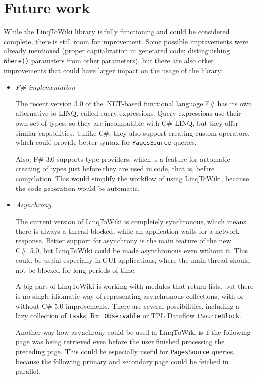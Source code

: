 \chapter{Future work}


While the LinqToWiki library is fully functioning and could be considered complete,
there is still room for improvement.
Some possible improvements were already mentioned
(proper capitalization in generated code;
distinguishing \lstinline{Where()} parameters from other parameters),
but there are also other improvements that could have larger impact on the usage of the library:

\begin{itemize}
\item \emph{F\# implementation}

The recent version 3.0 of the .NET-based functional language F\# has its own alternative to \ac{LINQ},
called query expressions.
Query expressions use their own set of types, so they are incompatible with C\# \ac{LINQ},
but they offer similar capabilities.
Unlike C\#, they also support creating custom operators,
which could provide better syntax for \lstinline{PagesSource} queries.

Also, F\# 3.0 supports type providers, which is a feature for automatic creating of types
just before they are used in code, that is, before compilation.
This would simplify the workflow of using LinqToWiki, because the code generation would be automatic.

\item \emph{Asynchrony}

The current version of LinqToWiki is completely synchronous,
which means there is always a thread blocked, while an application waits for a network response.
Better support for asynchrony is the main feature of the new C\#~5.0,
but LinqToWiki could be made asynchronous even without it.
This could be useful especially in \ac{GUI} applications, where the main thread should not be blocked for long periods of time.

A big part of LinqToWiki is working with modules that return lists,
but there is no single idiomatic way of representing asynchronous collections,
with or without C\# 5.0 improvements.
There are several possibilities, including a lazy collection of \lstinline{Task}s,
\acs{Rx} \lstinline{IObservable} or \acs{TPL} Dataflow \lstinline{ISourceBlock}.

Another way how asynchrony could be used in LinqToWiki is if the following page was being retrieved
even before the user finished processing the preceding page.
This could be especially useful for \lstinline{PagesSource} queries,
because the following primary and secondary page could be fetched in parallel.


\end{itemize}
